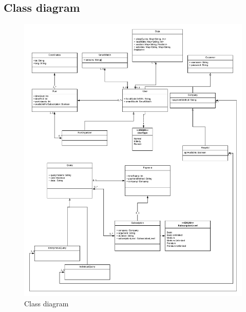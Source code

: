 \newpage
\subsection{Class diagram}
\begin{figure}[H]
	\includegraphics[width=\textwidth,height=\textheight,keepaspectratio]{assets/UML.pdf}
	\caption{Class diagram}
	\label{fig:ClassDiagram}
\end{figure}